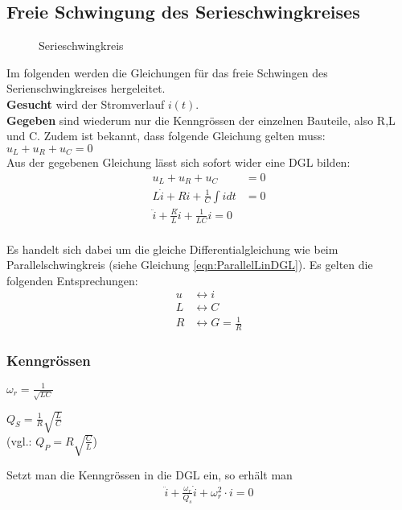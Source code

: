 \subsection{Freie Schwingung des Serieschwingkreises}

\begin{wrapfigure}{l}{0.55\textwidth}
	\centering
	
	\vspace{-0.15cm}
	\caption{Serieschwingkreis}
	\label{fig:SerieSKGeschlossen}
\end{wrapfigure}

Im folgenden werden die Gleichungen für das freie Schwingen des
Serienschwingkreises hergeleitet.\\

\textbf{Gesucht} wird der Stromverlauf
$i(t)$. \\
\textbf{Gegeben} sind wiederum nur die Kenngrössen der einzelnen Bauteile, also
R,L und C. Zudem ist bekannt, dass folgende Gleichung gelten muss: \\ $u_L +
u_R + u_C = 0$ \\


Aus der gegebenen Gleichung lässt sich sofort wider eine DGL bilden:
\begin{align}
	u_L + u_R + u_C &= 0\nonumber\\
	L\dot{i} + Ri + \frac{1}{C}\int{i}dt&=0\nonumber\\
	\boxed{\ddot{i}+\frac{R}{L}\dot{i}+\frac{1}{LC}i=0}
	\\
	\nonumber
\end{align}


Es handelt sich dabei um die gleiche Differentialgleichung wie beim
Parallelschwingkreis (siehe Gleichung \ref{eqn:ParallelLinDGL}). Es gelten die
folgenden Entsprechungen:
\begin{align}
u &\leftrightarrow i\nonumber\\
L &\leftrightarrow C\nonumber\\
R &\leftrightarrow G=\frac{1}{R}\nonumber
\end{align}


\subsubsection{Kenngrössen}
\begin{description}
[style=multiline,topsep=0pt,leftmargin=4.5cm,rightmargin=2cm]
  \item[Resonanzfrequenz] $\omega_r=\frac{1}{\sqrt{LC}}$
  \item[Güte Q] $Q_S=\frac{1}{R}\sqrt{\frac{L}{C}}$ \\
  	(vgl.: $Q_P=R\sqrt{\frac{C}{L}}$) 
\end{description}


Setzt man die Kenngrössen in die DGL ein, so erhält man 
\begin{align}
\boxed{\ddot i + \frac{\omega_r}{Q_s}\dot i + \omega_r^2\cdot i = 0}
\end{align}

